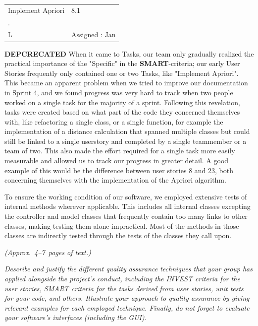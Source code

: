 \begin{table}
  \label{Example Task 1}
  \centering
	\begin{tabular}[h]{ |p{4cm} p{4cm}| }
	\hline
	Implement Apriori & 8.1 \\
	 . & \\
	 \hfill \break
	 L & Assigned : Jan 
	\end{tabular}
\end{table}

\newpage
\textbf{DEPCRECATED}
When it came to Tasks, our team only gradually realized the practical importance of the "Specific" in the \textbf{ SMART}-criteria; our early User Stories frequently only contained one or two Tasks, like "Implement Apriori". This became an apparent problem when we tried to improve our documentation in Sprint 4, and we found progress was very hard to track when two people worked on a single task for the majority of a sprint. 
Following this revelation, tasks were created based on what part of the code they concerned themselves with, like refactoring a single class, or a single function, for example the implementation of a distance calculation that spanned multiple classes but could still be linked to a single userstory and completed by a single teammember or a team of two. 
This also made the effort required for a single task more easily measurable and allowed us to track our progress in greater detail. A good example of this would be the difference between user stories 8 and 23, both concerning themselves with the implementation of the Apriori algorithm.

To ensure the working condition of our software, we employed extensive tests of internal methods wherever applicable. 
This includes all internal classes excepting the controller and model classes that frequently contain too many links to other classes, making testing them alone impractical. Most of the methods in those classes are indirectly tested through the tests of the classes they call upon. 


\emph{(Approx.~4--7~pages of text.)}

\emph{Describe and justify the different quality assurance techniques that your group has applied alongside the project's conduct, including the INVEST criteria for the user stories, SMART criteria for the tasks derived from user stories, unit tests for your code, and others.  Illustrate your approach to quality assurance by giving relevant examples for each employed technique. Finally, do not forget to evaluate your software's interfaces (including the GUI).}

